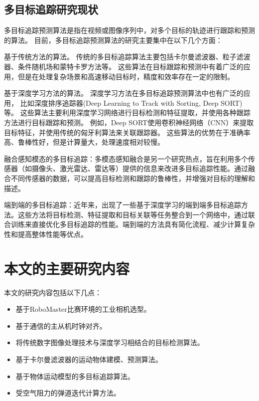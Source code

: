 \subsection{多目标追踪研究现状}
多目标追踪预测算法是指在视频或图像序列中，对多个目标的轨迹进行跟踪和预测的算法。
目前，多目标追踪预测算法的研究主要集中在以下几个方面：
\par
基于传统方法的算法。
传统的多目标追踪算法主要包括卡尔曼滤波器、粒子滤波器、条件随机场和蒙特卡罗方法等。
这些算法在目标跟踪和预测中有着广泛的应用，但是在处理复杂场景和高速移动目标时，精度和效率存在一定的限制。
\par
基于深度学习方法的算法。
深度学习方法在多目标追踪预测算法中也有广泛的应用\cite{xu2019deep}，
比如深度排序追踪器(Deep Learning to Track with Sorting, Deep SORT)\cite{wojke2017simple}等。
这些算法主要利用深度学习网络进行目标检测和特征提取，并使用各种跟踪方法进行目标跟踪和预测。
例如，Deep SORT使用卷积神经网络（CNN）来提取目标特征，并使用传统的匈牙利算法来关联跟踪器。
这些算法的优势在于准确率高、鲁棒性好，但是计算量大，处理速度相对较慢。
\par
融合感知模态的多目标追踪：多模态感知融合是另一个研究热点，旨在利用多个传感器（如摄像头、激光雷达、雷达等）提供的信息来改进多目标追踪性能。通过融合不同传感器的数据，可以提高目标检测和跟踪的鲁棒性，并增强对目标的理解和描述。
\par
端到端的多目标追踪：近年来，出现了一些基于深度学习的端到端多目标追踪方法。这些方法将目标检测、特征提取和目标关联等任务整合到一个网络中，通过联合训练来直接优化多目标追踪的性能。端到端的方法具有简化流程、减少计算复杂性和提高整体性能等优点。

\section{本文的主要研究内容}
本文的研究内容包括以下几点：
\begin{itemize}[itemindent=2em]
    \item 基于RoboMaster比赛环境的工业相机选型。
    \item 基于通信的主从机时钟对齐。
    \item 将传统数字图像处理技术与深度学习相结合的目标检测算法。
    \item 基于卡尔曼滤波器的运动物体建模、预测算法。
    \item 基于物体运动模型的多目标追踪算法。
    \item 受空气阻力的弹道迭代计算方法。
\end{itemize}





